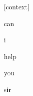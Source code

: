 \documentclass[varwidth]{standalone}
\begin{document}
\begin{CJK*}{UTF8}{gbsn}
{\setlength{\fboxsep}{0pt}\colorbox{white!0}{\parbox{0.9\textwidth}{
\colorbox{red!2.742501115093887e-09}{\strut [context]} \colorbox{red!7.842564082238823e-05}{\strut can} \colorbox{red!2.9053680918877944e-05}{\strut i} \colorbox{red!1.5927903652191162}{\strut help} \colorbox{red!1.120479941368103}{\strut you} \colorbox{red!97.28662109375}{\strut sir} 
}}}
\end{CJK*}
\end{document}

